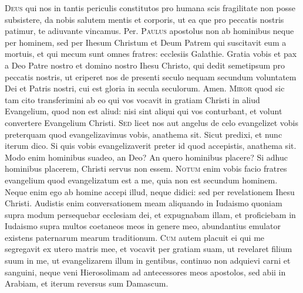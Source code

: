 \begin{multicols*}{2}
{\color{Red} }
\par {}
\lettrine[lines=2]{\zallmancaps \color{Red} D}{eus} qui nos in tantis periculis constitutos pro humana scis fragilitate non posse subsistere, da nobis salutem mentis et corporis, ut ea que pro peccatis nostris patimur, te adiuvante vincamus. Per.
\lettrine[lines=2]{\zallmancaps \color{Blue} P}{aulus} apostolus non ab hominibus neque per hominem, sed per Ihesum Christum et Deum Patrem qui suscitavit eum a mortuis, et qui mecum sunt omnes fratres: ecclesiis Galathie. Gratia vobis et pax a Deo Patre nostro et domino nostro Ihesu Christo, qui dedit semetipsum pro peccatis nostris, ut eriperet nos de presenti seculo nequam secundum voluntatem Dei et Patris nostri, cui est gloria in secula seculorum. Amen.
\lettrine[lines=2]{\zallmancaps \color{Red} M}{iror} quod sic tam cito transferimini ab eo qui vos vocavit in gratiam Christi in aliud Evangelium, quod non est aliud: nisi sint aliqui qui vos conturbant, et volunt convertere Evangelium Christi.
\lettrine[lines=2]{\zallmancaps \color{Blue} S}{ed} licet nos aut angelus de celo evangelizet vobis preterquam quod evangelizavimus vobis, anathema sit. Sicut predixi, et nunc iterum dico. Si quis vobis evangelizaverit preter id quod accepistis, anathema sit. Modo enim hominibus suadeo, an Deo? An quero hominibus placere? Si adhuc hominibus placerem, Christi servus non essem.
\lettrine[lines=2]{\zallmancaps \color{Red} N}{otum} enim vobis facio fratres evangelium quod evangelizatum est a me, quia non est secundum hominem. Neque enim ego ab homine accepi illud, neque didici: sed per revelationem Ihesu Christi. Audistis enim conversationem meam aliquando in Iudaismo quoniam supra modum persequebar ecclesiam dei, et expugnabam illam, et proficiebam in Iudaismo supra multos coetaneos meos in genere meo, abundantius emulator existens paternarum mearum traditionum.
\lettrine[lines=2]{\zallmancaps \color{Blue} C}{um} autem placuit ei qui me segregavit ex utero matris mee, et vocavit per gratiam suam, ut revelaret filium suum in me, ut evangelizarem illum in gentibus, continuo non adquievi carni et sanguini, neque veni Hierosolimam ad antecessores meos apostolos, sed abii in Arabiam, et iterum reversus sum Damascum.

\end{multicols*}
